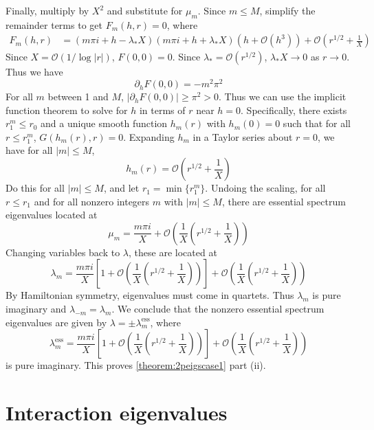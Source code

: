 \documentclass[thesis.tex]{subfiles}
\begin{document}
Finally, multiply by $X^2$ and substitute for $\mu_m$. Since $m \leq M$, simplify the remainder terms to get $F_m(h, r) = 0$, where
\begin{equation}\label{Bess4}
\begin{aligned}
F_m(h, r) &= (m \pi i + h - \lambda_* X)(m \pi i + h + \lambda_* X) \left( h + \mathcal{O}(h^3) \right) + \mathcal{O}\left( r^{1/2} + \frac{1}{X} \right)
\end{aligned}
\end{equation}
Since $X = \mathcal{O}(1/\log|r|)$, $F(0,0) = 0$. Since $\lambda_* = \mathcal{O}(r^{1/2})$, $\lambda_* X \rightarrow 0$ as $r \rightarrow 0$. Thus we have
\[
\partial_h F(0,0) = -m^2 \pi^2
\]
For all $m$ between 1 and $M$, $|\partial_h F(0,0)| \geq \pi^2 > 0$. Thus we can use the implicit function theorem to solve for $h$ in terms of $r$ near $h = 0$. Specifically, there exists $r_1^m \leq r_0$ and a unique smooth function $h_m(r)$ with $h_m(0) = 0$ such that for all $r \leq r_1^m$, $G(h_m(r),r) = 0$. Expanding $h_m$ in a Taylor series about $r = 0$, we have for all $|m| \leq M$,
\[
h_m(r) = \mathcal{O}\left( r^{1/2} + \frac{1}{X} \right)
\]
Do this for all $|m| \leq M$, and let $r_1 = \min\{ r_1^m \}$. Undoing the scaling, for all $r \leq r_1$ and for all nonzero integers $m$ with $|m| \leq M$, there are essential spectrum eigenvalues located at
\[
\mu_m = \frac{m \pi i}{X} + \mathcal{O}\left( \frac{1}{X}\left( r^{1/2} + \frac{1}{X} \right) \right)
\]
Changing variables back to $\lambda$, these are located at
\[
\lambda_m = \frac{m \pi i}{X}\left[1 + \mathcal{O}\left( \frac{1}{X}\left( r^{1/2} + \frac{1}{X} \right) \right) \right] + \mathcal{O}\left( \frac{1}{X}\left( r^{1/2} + \frac{1}{X} \right) \right)
\]
By Hamiltonian symmetry, eigenvalues must come in quartets. Thus $\lambda_m$ is pure imaginary and $\lambda_{-m} = \lambda_m$. We conclude that the nonzero essential spectrum eigenvalues are given by $\lambda = \pm \lambda_m^{\text{ess}}$, where
\[
\lambda_m^{\text{ess}} = \frac{m \pi i}{X}\left[1 + \mathcal{O}\left( \frac{1}{X}\left( r^{1/2} + \frac{1}{X} \right) \right) \right] + \mathcal{O}\left( \frac{1}{X}\left( r^{1/2} + \frac{1}{X} \right) \right)
\]
is pure imaginary. This proves \cref{theorem:2peigscase1} part (ii).

\section{Interaction eigenvalues}
\end{document}
